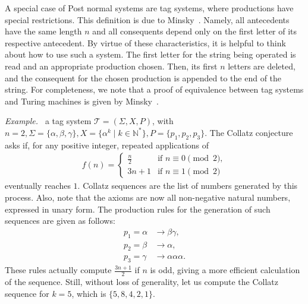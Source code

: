 \documentclass[12pt]{article}
\begin{document}
A special case of Post normal systems are tag systems, where productions have special restrictions. This definition is due to Minsky~\cite[Sec. 14.6]{Minsky:book:1967}. Namely, all antecedents have the same length $n$ and all consequents depend only on the first letter of its respective antecedent. By virtue of these characteristics, it is helpful to think about how to use such a system. The first letter for the string being operated is read and an appropriate production chosen. Then, its first $n$ letters are deleted, and the consequent for the chosen production is appended to the end of the string. For completeness, we note that a proof of equivalence between tag systems and Turing machines is given by Minsky~\cite[Theorem 14.6-1]{Minsky:book:1967}.

\emph{Example.~\cite[Theorem 2.1]{DeMol:article:2008:nov}} a tag system $\mathcal{T} = (\Sigma, X, P)$, with $n = 2, \Sigma = \{\alpha, \beta, \gamma\}, X = \{\alpha^{k} \mid k \in \mathbb{N}^{*}\}, P = \{p_{1}, p_{2}, p_{3}\}$. The Collatz conjecture asks if, for any positive integer, repeated applications of
\begin{align}
    f(n) = 
    \begin{cases}
        \frac{n}{2} & \text{if } n \equiv 0 \pmod{2}, \\
        3n + 1      & \text{if } n \equiv 1 \pmod{2}
    \end{cases}
\end{align}
eventually reaches $1$. Collatz sequences are the list of numbers generated by this process. Also, note that the axioms are now all non-negative natural numbers, expressed in unary form. The production rules for the generation of such sequences are given as follows:
\begin{align}
    p_{1} = \alpha &\rightarrow \beta\gamma,        \\
    p_{2} = \beta  &\rightarrow \alpha,             \\
    p_{3} = \gamma &\rightarrow \alpha\alpha\alpha.
\end{align}
These rules actually compute $\frac{3n + 1}{2}$ if $n$ is odd, giving a more efficient calculation of the sequence. Still, without loss of generality, let us compute the Collatz sequence for $k = 5$, which is $\{5, 8, 4, 2, 1\}$.
\end{document}
